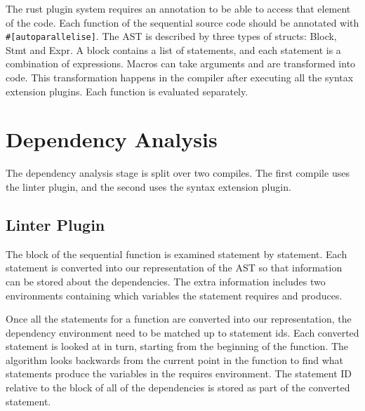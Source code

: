 The rust plugin system requires an annotation to be able to access that element of the code. Each function of the sequential source code should be annotated with \texttt{\#[autoparallelise]}. The AST is described by three types of structs: Block, Stmt and Expr. A block contains a list of statements, and each statement is a combination of expressions. Macros can take arguments and are transformed into code. This transformation happens in the compiler after executing all the syntax extension plugins. Each function is evaluated separately.

\section{Dependency Analysis}
The dependency analysis stage is split over two compiles. The first compile uses the linter plugin, and the second uses the syntax extension plugin.

\subsection{Linter Plugin}


The block of the sequential function is examined statement by statement. Each statement is converted into our representation of the AST so that information can be stored about the dependencies. The extra information includes two environments containing which variables the statement requires and produces.

Once all the statements for a function are converted into our representation, the dependency environment need to be matched up to statement ids. Each converted statement is looked at in turn, starting from the beginning of the function. The algorithm looks backwards from the current point in the function to find what statements produce the variables in the requires environment. The statement ID relative to the block of all of the dependencies is stored as part of the converted statement.

